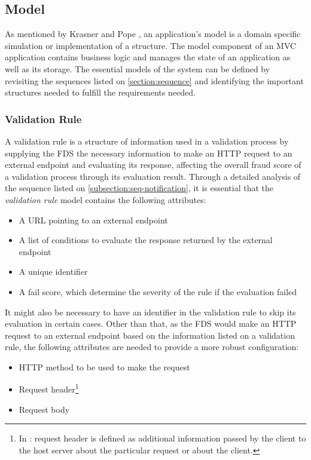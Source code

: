 \subsection{Model}
  \label{subsection:model}

As mentioned by Krasner and Pope \autocite{krasner-pope-88}, an application's model is a domain specific simulation or implementation of a structure. The model component of an MVC application contains business logic and manages the state of an application as well as its storage. 
The essential models of the system can be defined by revisiting the sequences listed on \autoref{section:sequence} and identifying the important structures needed to fulfill the requirements needed.
  
\subsubsection{Validation Rule}
A validation rule is a structure of information used in a validation process by supplying the FDS the necessary information to make an HTTP request to an external endpoint and evaluating its response, affecting the overall fraud score of a validation process through its evaluation result. Through a detailed analysis of the sequence listed on \autoref{subsection:seq-notification}, it is essential that the \emph{validation rule} model contains the following attributes:

\begin{itemize}
  \item A URL pointing to an external endpoint
  \item A list of conditions to evaluate the response returned by the external endpoint
  \item A unique identifier
  \item A fail score, which determine the severity of the rule if the evaluation failed
\end{itemize}

It might also be necessary to have an identifier in the validation rule to skip its evaluation in certain cases. Other than that, as the FDS would make an HTTP request to an external endpoint based on the information listed on a validation rule, the following attributes are needed to provide a more robust configuration:

\begin{itemize}
  \item HTTP method to be used to make the request
  \item Request header\footnote{In \autocite[\enquote{5.3 Request Header Fields}]{http-rfc}: request header is defined as additional information passed by the client to the host server about the particular request or about the client.}
  \item Request body
\end{itemize}

